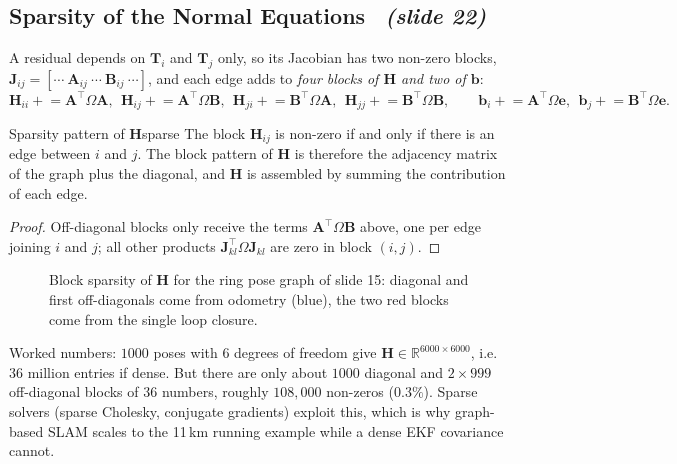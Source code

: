 \documentclass[11pt,a4paper]{article}
\newcommand{\slrs}[1]{\texorpdfstring{\ \emph{(slide #1)}}{ (slide #1)}}
\newcommand{\R}{\mathbb{R}}
\newcommand{\be}{\mathbf{e}}
\newcommand{\bH}{\mathbf{H}}
\newcommand{\bb}{\mathbf{b}}
\newcommand{\bJ}{\mathbf{J}}
\newcommand{\bT}{\mathbf{T}}
\begin{document}
\subsection{Sparsity of the Normal Equations \slrs{22}}
A residual depends on $\bT_i$ and $\bT_j$ only, so its Jacobian has two non-zero blocks, $\bJ_{ij}=[\cdots\ \mathbf A_{ij}\ \cdots\ \mathbf B_{ij}\ \cdots]$, and each edge adds to \emph{four blocks of $\bH$ and two of $\bb$}:
\[
\bH_{ii}\mathrel{+}=\mathbf A^\top\Omega\mathbf A,\ \ \bH_{ij}\mathrel{+}=\mathbf A^\top\Omega\mathbf B,\ \ \bH_{ji}\mathrel{+}=\mathbf B^\top\Omega\mathbf A,\ \ \bH_{jj}\mathrel{+}=\mathbf B^\top\Omega\mathbf B,\qquad
\bb_i\mathrel{+}=\mathbf A^\top\Omega\be,\ \ \bb_j\mathrel{+}=\mathbf B^\top\Omega\be.
\]
\begin{proposition}{Sparsity pattern of $\bH$}{sparse}
The block $\bH_{ij}$ is non-zero if and only if there is an edge between $i$ and $j$. The block pattern of $\bH$ is therefore the adjacency matrix of the graph plus the diagonal, and $\bH$ is assembled by summing the contribution of each edge.
\end{proposition}
\begin{proof}
Off-diagonal blocks only receive the terms $\mathbf A^\top\Omega\mathbf B$ above, one per edge joining $i$ and $j$; all other products $\bJ_{kl}^\top\Omega\bJ_{kl}$ are zero in block $(i,j)$. \qedhere
\end{proof}
\begin{figure}[htbp]\centering
{}
\caption{Block sparsity of $\bH$ for the ring pose graph of slide 15: diagonal and first off-diagonals come from odometry (blue), the two red blocks come from the single loop closure.}
\end{figure}
\begin{intuition}
Worked numbers: $1000$ poses with $6$ degrees of freedom give $\bH\in\R^{6000\times6000}$, i.e.\ $36$ million entries if dense. But there are only about $1000$ diagonal and $2\times999$ off-diagonal blocks of $36$ numbers, roughly $108{,}000$ non-zeros ($0.3\%$). Sparse solvers (sparse Cholesky, conjugate gradients) exploit this, which is why graph-based SLAM scales to the 11\,km running example while a dense EKF covariance cannot.
\end{intuition}
\end{document}
